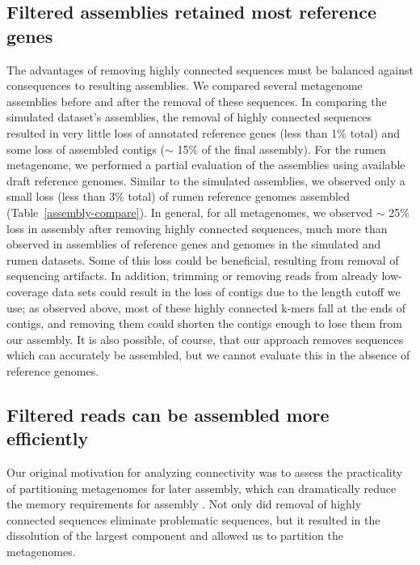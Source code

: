 \documentclass[10pt]{article}
\begin{document}
\subsection*{Filtered assemblies retained most reference genes}

The advantages of removing highly connected sequences must be balanced
against consequences to resulting assemblies.  We compared several
metagenome assemblies before and after the removal of these sequences.
In comparing the simulated dataset's assemblies, the removal of highly
connected sequences resulted in very little loss of annotated
reference genes (less than 1\% total) and some loss of assembled contigs
($\sim$ 15\% of the final assembly).  For the rumen metagenome, we
performed a partial evaluation of the assemblies using available draft
reference genomes.  Similar to the simulated assemblies, we observed
only a small loss (less than 3\% total) of rumen reference genomes assembled
(Table~\ref{assembly-compare}). In general, for all metagenomes, we observed $\sim$ 25\%
loss in assembly after removing highly connected sequences, much more
than observed in assemblies of reference genes and genomes in the
simulated and rumen datasets.  Some of this loss could be beneficial,
resulting from removal of sequencing artifacts.  In addition, trimming
or removing reads from already low-coverage data sets could result in
the loss of contigs due to the length cutoff we use; as observed
above, most of these highly connected k-mers fall at the ends of
contigs, and removing them could shorten the contigs enough to lose
them from our assembly.  It is also possible, of course, that our
approach removes sequences which can accurately be assembled, but we
cannot evaluate this in the absence of reference genomes.

\subsection*{Filtered reads can be assembled more efficiently}

Our original motivation for analyzing connectivity was to assess the
practicality of partitioning metagenomes for later assembly, which can
dramatically reduce the memory requirements for assembly
\cite{Pell:2012cq}.  Not only did removal of highly connected sequences
eliminate problematic sequences, but it resulted in the dissolution
of the largest component and allowed us to partition the metagenomes.
\end{document}
